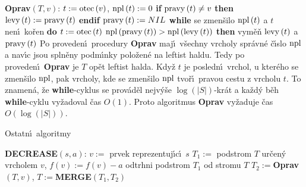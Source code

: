 {\bf Oprav$\left(T,v\right)$}:\newline 
$t:=\operatorname{otec}\left(v\right)$, $\operatorname{npl}\left(t\right):=0$\newline 
{\bf if} $\operatorname{pravy}\left(t\right)\ne v$ {\bf then} $\operatorname{levy}\left(t\right):=\operatorname{pravy}\left(t\right)$ {\bf endif\newline 
$\operatorname{pravy}\left(t\right):=NIL$\newline 
while} se zmen\v silo $\operatorname{npl}\left(t\right)$ a $t$ nen\'\i\ ko\v ren {\bf do}\newline 
\phantom{---}$t:=\operatorname{otec}\left(t\right)$\newline
\phantom{---}{\bf if} $\operatorname{npl}\left(\operatorname{pravy}\left(t\right)\right)>\operatorname{npl}\left(\operatorname{levy}\left(t\right)\right)$ {\bf then}\newline 
\phantom{------}vym\v e\v n $\operatorname{levy}\left(t\right)$ a $\operatorname{pravy}\left(t\right)$\newline 
{}\flushpar Po proveden\'\i\ procedury {\bf Oprav} maj\'\i\ v\v sechny vrcholy 
spr\'avn\'e \v c\'\i slo $\operatorname{npl}$ a nav\'\i c jsou spln\v eny podm\'\i nky polo\v zen\'e na 
leftist haldu.  Tedy po proveden\'\i\ {\bf Oprav} je $T$ op\v et 
leftist halda.  Kdy\v z $t$ je posledn\'\i\ vrchol, u kter\'eho se zmen\v silo 
$\operatorname{npl}$, pak vrcholy, kde se zmen\v silo $\operatorname{npl}$ tvo\v r\'\i\ pravou cestu z 
vrcholu $t$.  To znamen\'a, \v ze {\bf while}-cyklus se prov\'ad\v el nejv\'y\v se 
$\log\left(|S|\right)$-kr\'at a ka\v zd\'y b\v eh {\bf while}-cyklu vy\v zadoval \v cas $
O\left(1\right)$.  
Proto  
algoritmus {\bf Oprav} vy\v zaduje \v cas $O\left(\log\left(|S|\right)\right)$.  
\medskip

\subhead
Ostatn\'\i\ algoritmy
\endsubhead
\bigskip

{\bf DECREASE$\left(s,a\right)$}:\newline
$v:=$ prvek reprezentuj\'\i c\'\i\ $s$\newline 
$T_1:=$ podstrom $T$ ur\v cen\'y vrcholem $v$, $f\left(v\right):=f\left(v\right)-a$\newline 
odtrhni podstrom $T_1$ od stromu $T$\newline 
$T_2:=${\bf Oprav$\left(T,v\right)$}, $T:=${\bf MERGE$\left(T_1,T_2\right)$}
\bigskip

